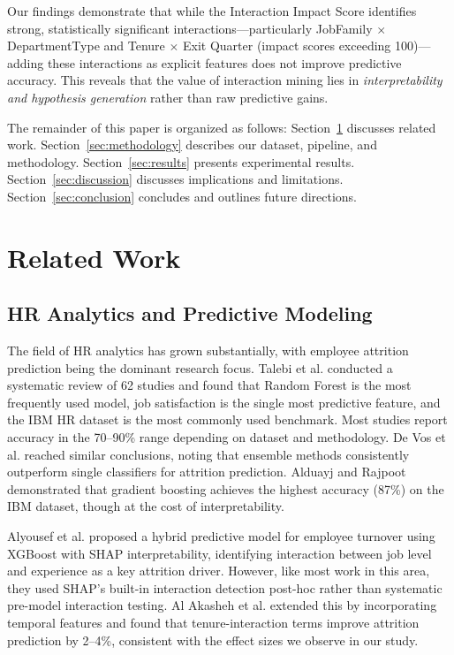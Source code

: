 \documentclass[twocolumn]{article}
\begin{document}
Our findings demonstrate that while the Interaction Impact Score identifies strong, statistically significant interactions---particularly JobFamily $\times$ DepartmentType and Tenure $\times$ Exit Quarter (impact scores exceeding 100)---adding these interactions as explicit features does not improve predictive accuracy. This reveals that the value of interaction mining lies in \textit{interpretability and hypothesis generation} rather than raw predictive gains.

The remainder of this paper is organized as follows: Section~\ref{sec:related} discusses related work. Section~\ref{sec:methodology} describes our dataset, pipeline, and methodology. Section~\ref{sec:results} presents experimental results. Section~\ref{sec:discussion} discusses implications and limitations. Section~\ref{sec:conclusion} concludes and outlines future directions.

\section{Related Work}
\label{sec:related}

\subsection{HR Analytics and Predictive Modeling}

The field of HR analytics has grown substantially, with employee attrition prediction being the dominant research focus. Talebi et al. \cite{talebi2025systematic} conducted a systematic review of 62 studies and found that Random Forest is the most frequently used model, job satisfaction is the single most predictive feature, and the IBM HR dataset \cite{ibmhr} is the most commonly used benchmark. Most studies report accuracy in the 70--90\% range depending on dataset and methodology. De Vos et al. \cite{devos2024predicting} reached similar conclusions, noting that ensemble methods consistently outperform single classifiers for attrition prediction. Alduayj and Rajpoot \cite{alduayj2020predicting} demonstrated that gradient boosting achieves the highest accuracy (87\%) on the IBM dataset, though at the cost of interpretability.

Alyousef et al. \cite{alyousef2026hybrid} proposed a hybrid predictive model for employee turnover using XGBoost with SHAP interpretability, identifying interaction between job level and experience as a key attrition driver. However, like most work in this area, they used SHAP's built-in interaction detection post-hoc rather than systematic pre-model interaction testing. Al Akasheh et al. \cite{alakasheh2023decade} extended this by incorporating temporal features and found that tenure-interaction terms improve attrition prediction by 2--4\%, consistent with the effect sizes we observe in our study.
\end{document}
